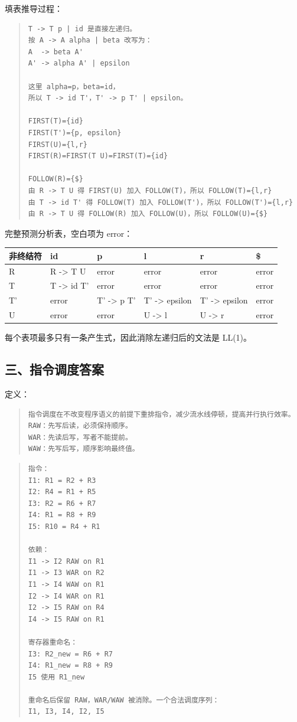 \documentclass[UTF8,zihao=-4]{ctexart}
\begin{document}
填表推导过程：

\begin{quote}
\footnotesize
\begin{verbatim}
T -> T p | id 是直接左递归。
按 A -> A alpha | beta 改写为：
A  -> beta A'
A' -> alpha A' | epsilon

这里 alpha=p，beta=id，
所以 T -> id T'，T' -> p T' | epsilon。

FIRST(T)={id}
FIRST(T')={p, epsilon}
FIRST(U)={l,r}
FIRST(R)=FIRST(T U)=FIRST(T)={id}

FOLLOW(R)={$}
由 R -> T U 得 FIRST(U) 加入 FOLLOW(T)，所以 FOLLOW(T)={l,r}
由 T -> id T' 得 FOLLOW(T) 加入 FOLLOW(T')，所以 FOLLOW(T')={l,r}
由 R -> T U 得 FOLLOW(R) 加入 FOLLOW(U)，所以 FOLLOW(U)={$}
\end{verbatim}
\end{quote}

完整预测分析表，空白项为 error：

\begin{center}
\footnotesize
\begin{tabular}{llllll}
\hline
非终结符 & id & p & l & r & \$ \\
\hline
R & R -> T U & error & error & error & error \\
T & T -> id T' & error & error & error & error \\
T' & error & T' -> p T' & T' -> epsilon & T' -> epsilon & error \\
U & error & error & U -> l & U -> r & error \\
\hline
\end{tabular}
\end{center}

每个表项最多只有一条产生式，因此消除左递归后的文法是 LL(1)。



\subsection{三、指令调度答案}


定义：


\begin{quote}
\footnotesize
\begin{verbatim}
指令调度在不改变程序语义的前提下重排指令，减少流水线停顿，提高并行执行效率。
RAW：先写后读，必须保持顺序。
WAR：先读后写，写者不能提前。
WAW：先写后写，顺序影响最终值。
\end{verbatim}
\end{quote}


\begin{quote}
\footnotesize
\begin{verbatim}
指令：
I1: R1 = R2 + R3
I2: R4 = R1 + R5
I3: R2 = R6 + R7
I4: R1 = R8 + R9
I5: R10 = R4 + R1

依赖：
I1 -> I2 RAW on R1
I1 -> I3 WAR on R2
I1 -> I4 WAW on R1
I2 -> I4 WAR on R1
I2 -> I5 RAW on R4
I4 -> I5 RAW on R1

寄存器重命名：
I3: R2_new = R6 + R7
I4: R1_new = R8 + R9
I5 使用 R1_new

重命名后保留 RAW，WAR/WAW 被消除。一个合法调度序列：
I1, I3, I4, I2, I5
\end{verbatim}
\end{quote}
\end{document}
